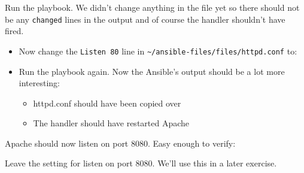 Run the playbook. We didn't change anything in the file yet so there
should not be any \texttt{changed} lines in the output and of course the
handler shouldn't have fired.

\begin{itemize}
\tightlist
\item
  Now change the \texttt{Listen\ 80} line in
  \texttt{\textasciitilde{}/ansible-files/files/httpd.conf} to:
\end{itemize}

\begin{Shaded}
\begin{Highlighting}[]
\end{Highlighting}
\end{Shaded}

\begin{itemize}
\item
  Run the playbook again. Now the Ansible's output should be a lot more
  interesting:

  \begin{itemize}
  \tightlist
  \item
    httpd.conf should have been copied over
  \item
    The handler should have restarted Apache
  \end{itemize}
\end{itemize}

Apache should now listen on port 8080. Easy enough to verify:

\begin{Shaded}
\begin{Highlighting}[]
\ExtensionTok{[student@controller}\NormalTok{ ansible{-}files]$ curl http://10.3.48.[100+PARTICIPANT\_ID]}
  
\ExtensionTok{[student@controller}\NormalTok{ ansible{-}files]$ curl http://10.3.48.[100+PARTICIPANT\_ID]:8080}
\OperatorTok{\textless{}}\OperatorTok{\textgreater{}}
\OperatorTok{  \textless{}}\OperatorTok{\textgreater{}}\OperatorTok{\textless{}}\OperatorTok{\textgreater{}}
\OperatorTok{\textless{}}\OperatorTok{\textgreater{}}
\end{Highlighting}
\end{Shaded}

Leave the setting for listen on port 8080. We'll use this in a later
exercise.

